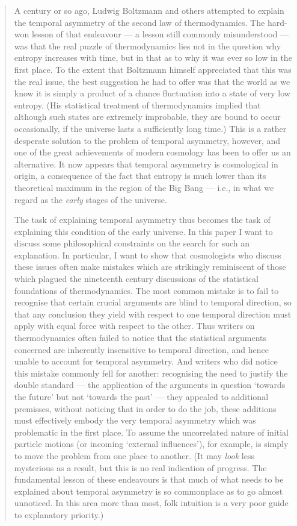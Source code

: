 \documentclass[12pt]{article}
\begin{document}
\begin{quote}
A century or so ago, Ludwig Boltzmann and others attempted to explain
the temporal asymmetry of the second law of thermodynamics. The hard-won
lesson of that endeavour --- a lesson still commonly misunderstood ---
was that the real puzzle of thermodynamics lies not in the question why
entropy increases with time, but in that as to why it was ever so low in
the first place. To the extent that Boltzmann himself appreciated that
this was the real issue, the best suggestion he had to offer was that
the world as we know it is simply a product of a chance fluctuation into
a state of very low entropy. (His statistical treatment of
thermodynamics implied that although such states are extremely
improbable, they are bound to occur occasionally, if the universe lasts
a sufficiently long time.) This is a rather desperate solution to the
problem of temporal asymmetry, however, and one of the great
achievements of modern cosmology has been to offer us an alternative. It
now appears that temporal asymmetry is cosmological in origin, a
consequence of the fact that entropy is much lower than its theoretical
maximum in the region of the Big Bang --- i.e., in what we regard as the
\emph{early} stages of the universe.

The task of explaining temporal asymmetry thus becomes the task of
explaining this condition of the early universe. In this paper I want to
discuss some philosophical constraints on the search for such an
explanation. In particular, I want to show that cosmologists who discuss
these issues often make mistakes which are strikingly reminiscent of
those which plagued the nineteenth century discussions of the
statistical foundations of thermodynamics. The most common mistake is to
fail to recognise that certain crucial arguments are blind to temporal
direction, so that any conclusion they yield with respect to one
temporal direction must apply with equal force with respect to the
other. Thus writers on thermodynamics often failed to notice that the
statistical arguments concerned are inherently insensitive to temporal
direction, and hence unable to account for temporal asymmetry. And
writers who did notice this mistake commonly fell for another:
recognising the need to justify the double standard --- the application
of the arguments in question `towards the future' but not `towards the
past' --- they appealed to additional premisses, without noticing that
in order to do the job, these additions must effectively embody the very
temporal asymmetry which was problematic in the first place. To assume
the uncorrelated nature of initial particle motions (or incoming
`external influences'), for example, is simply to move the problem from
one place to another. (It may \emph{look} less mysterious as a result,
but this is no real indication of progress. The fundamental lesson of
these endeavours is that much of what needs to be explained about
temporal asymmetry is so commonplace as to go almost unnoticed. In this
area more than most, folk intuition is a very poor guide to explanatory
priority.)


\end{quote}
\end{document}
